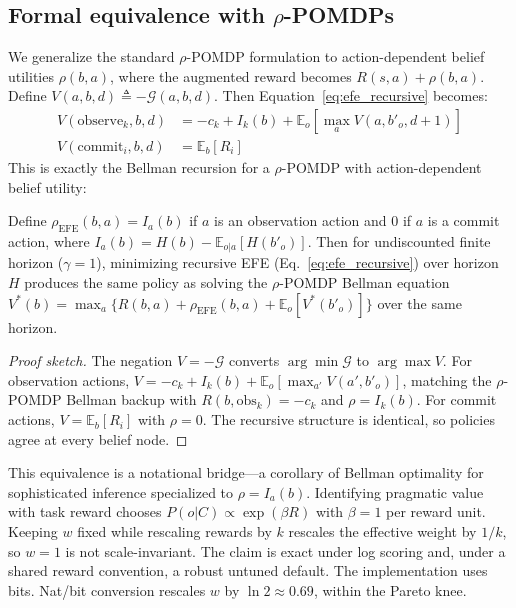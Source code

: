 \documentclass[runningheads]{llncs}
\begin{document}
\subsection{Formal equivalence with $\rho$-POMDPs}
\label{subsec:formal_rho_equiv}

We generalize the standard $\rho$-POMDP formulation to action-dependent belief utilities $\rho(b, a)$, where the augmented reward becomes $R(s,a) + \rho(b,a)$. Define $V(a, b, d) \triangleq -\mathcal{G}(a, b, d)$. Then Equation~\ref{eq:efe_recursive} becomes:
\begin{align}
    V(\text{observe}_k, b, d) &= -c_k + I_k(b) + \mathbb{E}_o\!\left[\max_a V(a, b'_o, d{+}1)\right] \label{eq:bellman_obs} \\
    V(\text{commit}_i, b, d) &= \mathbb{E}_b[R_i] \label{eq:bellman_commit}
\end{align}
This is exactly the Bellman recursion for a $\rho$-POMDP with action-dependent belief utility:

\begin{proposition}
\label{prop:equivalence}
Define $\rho_{\mathrm{EFE}}(b, a) = I_a(b)$ if $a$ is an observation action and $0$ if $a$ is a commit action, where $I_a(b) = H(b) - \mathbb{E}_{o|a}[H(b'_o)]$. Then for undiscounted finite horizon ($\gamma{=}1$), minimizing recursive EFE (Eq.~\ref{eq:efe_recursive}) over horizon $H$ produces the same policy as solving the $\rho$-POMDP Bellman equation $V^*(b) = \max_a \{R(b,a) + \rho_{\mathrm{EFE}}(b,a) + \mathbb{E}_o[V^*(b'_o)]\}$ over the same horizon.
\end{proposition}
\begin{proof}[Proof sketch]
The negation $V = -\mathcal{G}$ converts $\arg\min \mathcal{G}$ to $\arg\max V$. For observation actions, $V = -c_k + I_k(b) + \mathbb{E}_o[\max_{a'} V(a', b'_o)]$, matching the $\rho$-POMDP Bellman backup with $R(b, \text{obs}_k) = -c_k$ and $\rho = I_k(b)$. For commit actions, $V = \mathbb{E}_b[R_i]$ with $\rho = 0$. The recursive structure is identical, so policies agree at every belief node.
\end{proof}

This equivalence is a notational bridge---a corollary of Bellman optimality for sophisticated inference \citep{dacosta2020b} specialized to $\rho = I_a(b)$. Identifying pragmatic value with task reward chooses $P(o|C) \propto \exp(\beta R)$ with $\beta{=}1$ per reward unit. Keeping $w$ fixed while rescaling rewards by $k$ rescales the effective weight by $1/k$, so $w{=}1$ is not scale-invariant. The claim is exact under log scoring \citep{bernardo1979} and, under a shared reward convention, a robust untuned default. The implementation uses bits. Nat/bit conversion rescales $w$ by $\ln 2 \approx 0.69$, within the Pareto knee.
\end{document}
